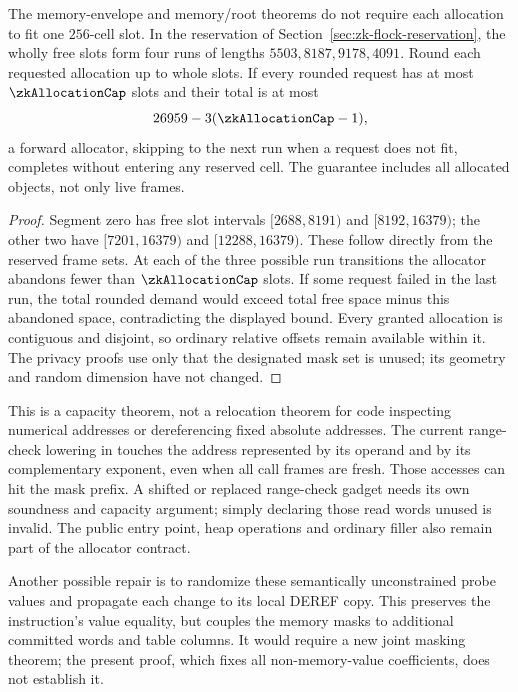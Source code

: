 \begin{proposition}\label{prop:zk-multislot-allocation}
The memory-envelope and memory/root theorems do not require each allocation to fit one $256$-cell slot. In the reservation of Section~\ref{sec:zk-flock-reservation}, the wholly free slots form four runs of lengths $5503,8187,9178,4091$. Round each requested allocation up to whole slots. If every rounded request has at most $\zkAllocationCap$ slots and their total is at most
\[
 26959-3(\zkAllocationCap-1),
\]
a forward allocator, skipping to the next run when a request does not fit, completes without entering any reserved cell. The guarantee includes all allocated objects, not only live frames.
\end{proposition}
\begin{proof}
Segment zero has free slot intervals $[2688,8191)$ and $[8192,16379)$; the other two have $[7201,16379)$ and $[12288,16379)$. These follow directly from the reserved frame sets. At each of the three possible run transitions the allocator abandons fewer than $\zkAllocationCap$ slots. If some request failed in the last run, the total rounded demand would exceed total free space minus this abandoned space, contradicting the displayed bound. Every granted allocation is contiguous and disjoint, so ordinary relative offsets remain available within it. The privacy proofs use only that the designated mask set is unused; its geometry and random dimension have not changed.
\end{proof}

This is a capacity theorem, not a relocation theorem for code inspecting numerical addresses or dereferencing fixed absolute addresses. The current range-check lowering in  touches the address represented by its operand and by its complementary exponent, even when all call frames are fresh. Those accesses can hit the mask prefix. A shifted or replaced range-check gadget needs its own soundness and capacity argument; simply declaring those read words unused is invalid. The public entry point, heap operations and ordinary filler also remain part of the allocator contract.

Another possible repair is to randomize these semantically unconstrained probe values and propagate each change to its local DEREF copy. This preserves the instruction's value equality, but couples the memory masks to additional committed words and table columns. It would require a new joint masking theorem; the present proof, which fixes all non-memory-value coefficients, does not establish it.

